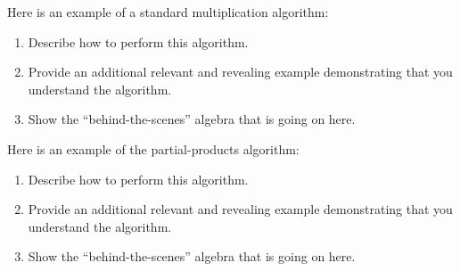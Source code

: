 \documentclass[nooutcomes]{ximera}
\begin{document}
\begin{problem}Here is an example of a standard multiplication algorithm:
\begin{image}
\end{image}

\begin{enumerate}
\item Describe how to perform this algorithm.
\item Provide an additional relevant and revealing example
  demonstrating that you understand the algorithm.
\item Show the ``behind-the-scenes'' algebra that is going on here.
\end{enumerate}
\end{problem} 

\begin{problem}\label{P:MS} Here is an example of the partial-products 
  algorithm: 
\begin{image}
\end{image}
\begin{enumerate}
\item Describe how to perform this algorithm.
\item Provide an additional relevant and revealing example
  demonstrating that you understand the algorithm.
\item Show the ``behind-the-scenes'' algebra that is going on here.
\end{enumerate}
\end{problem} 
\end{document}
